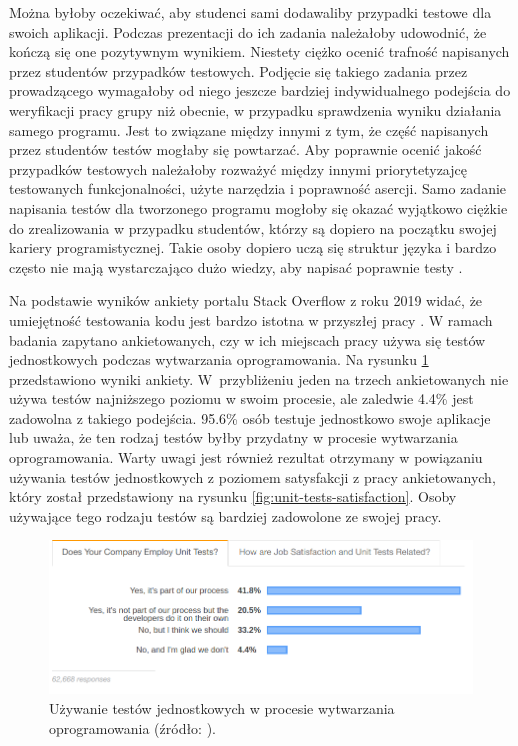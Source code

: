 Można byłoby oczekiwać, aby studenci sami dodawaliby przypadki testowe dla swoich aplikacji.
Podczas prezentacji do ich zadania należałoby udowodnić, że kończą się one pozytywnym wynikiem.
Niestety ciężko ocenić trafność napisanych przez studentów przypadków testowych.
Podjęcie się takiego zadania przez prowadzącego wymagałoby od niego jeszcze bardziej indywidualnego podejścia do weryfikacji pracy grupy niż obecnie, w przypadku sprawdzenia wyniku działania samego programu.
Jest to związane między innymi z tym, że część napisanych przez studentów testów mogłaby się powtarzać.
Aby poprawnie ocenić jakość przypadków testowych należałoby rozważyć  między innymi priorytetyzajcę testowanych funkcjonalności, użyte narzędzia i poprawność asercji.
Samo zadanie napisania testów dla tworzonego programu mogłoby się okazać wyjątkowo ciężkie do zrealizowania w przypadku studentów, którzy są dopiero na początku swojej kariery programistycznej.
Takie osoby dopiero uczą się struktur języka i bardzo często nie mają wystarczająco dużo wiedzy, aby napisać poprawnie testy \cite{tests-and-begginers}.

Na podstawie wyników ankiety portalu Stack Overflow z roku 2019 widać, że umiejętność testowania kodu jest bardzo istotna w przyszłej pracy \cite{stack-overflow-survey}.
W ramach badania zapytano ankietowanych, czy w ich miejscach pracy używa się testów jednostkowych podczas wytwarzania oprogramowania.
Na rysunku \ref{fig:unit-tests-use} przedstawiono wyniki ankiety.
W~przybliżeniu jeden na trzech ankietowanych nie używa testów najniższego poziomu w swoim procesie, ale zaledwie 4.4\% jest zadowolna z takiego podejścia.
95.6\% osób testuje jednostkowo swoje aplikacje lub uważa, że ten rodzaj testów byłby przydatny w procesie wytwarzania oprogramowania. 
Warty uwagi jest również rezultat otrzymany w powiązaniu używania testów jednostkowych z poziomem satysfakcji z pracy ankietowanych, który został przedstawiony na rysunku \ref{fig:unit-tests-satisfaction}.
Osoby używające tego rodzaju testów są bardziej zadowolone ze swojej pracy.

\begin{figure}[h]
    \centering
    \includegraphics[width = 13cm]{chapter02/unit-tests-use.png}
    \caption{Używanie testów jednostkowych w procesie wytwarzania oprogramowania (źródło: \cite{stack-overflow-survey}).}
    \label{fig:unit-tests-use}
\end{figure}

